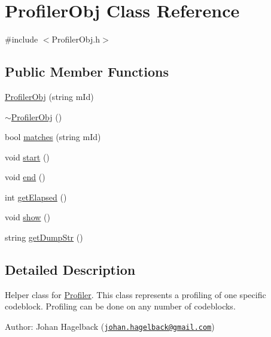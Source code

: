 \hypertarget{class_profiler_obj}{\section{Profiler\-Obj Class Reference}
\label{class_profiler_obj}
}


{\ttfamily \#include $<$Profiler\-Obj.\-h$>$}

\subsection*{Public Member Functions}
\begin{DoxyCompactItemize}
\item 
\hyperlink{class_profiler_obj_a8325dc4571537b9a3da0e0c305e00c18}{Profiler\-Obj} (string m\-Id)
\item 
\hyperlink{class_profiler_obj_a1103c5bcee4507ec4995ad812d3f5aa4}{$\sim$\-Profiler\-Obj} ()
\item 
bool \hyperlink{class_profiler_obj_ac5eb8d8990bf0a8849a83b915ead3ae5}{matches} (string m\-Id)
\item 
void \hyperlink{class_profiler_obj_a8ee28f19edb059b3a8c053bf9a454c9f}{start} ()
\item 
void \hyperlink{class_profiler_obj_a532ea624936449485bb05606254114f2}{end} ()
\item 
int \hyperlink{class_profiler_obj_ad95b7505c760b79467b0e17f7b4a0b46}{get\-Elapsed} ()
\item 
void \hyperlink{class_profiler_obj_a898d439c88e07b773523b4fae3a65c94}{show} ()
\item 
string \hyperlink{class_profiler_obj_a887b28c2812f3740eec00f03cfa89c95}{get\-Dump\-Str} ()
\end{DoxyCompactItemize}


\subsection{Detailed Description}
Helper class for \hyperlink{class_profiler}{Profiler}. This class represents a profiling of one specific codeblock. Profiling can be done on any number of codeblocks.

Author\-: Johan Hagelback (\href{mailto:johan.hagelback@gmail.com}{\tt johan.\-hagelback@gmail.\-com}) 

